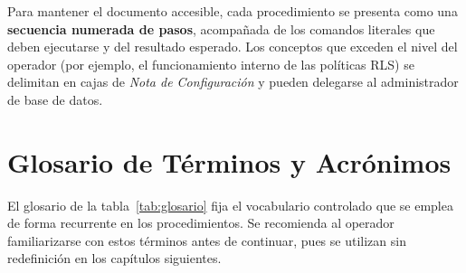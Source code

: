 \par\vspace{0.3cm}
Para mantener el documento accesible, cada procedimiento se presenta como una
\textbf{secuencia numerada de pasos}, acompañada de los comandos literales que deben
ejecutarse y del resultado esperado. Los conceptos que exceden el nivel del operador
(por ejemplo, el funcionamiento interno de las políticas RLS) se delimitan en cajas de
\textit{Nota de Configuración} y pueden delegarse al administrador de base de datos.\par

\section{Glosario de Términos y Acrónimos}%
\label{sec:glosario}

El glosario de la tabla~\ref{tab:glosario} fija el vocabulario controlado que se emplea
de forma recurrente en los procedimientos. Se recomienda al operador familiarizarse con
estos términos antes de continuar, pues se utilizan sin redefinición en los capítulos
siguientes.\par

